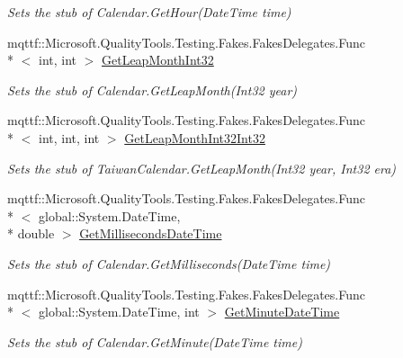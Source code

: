 \begin{DoxyCompactItemize}
\begin{DoxyCompactList}\small\item\em Sets the stub of Calendar.\-Get\-Hour(\-Date\-Time time)\end{DoxyCompactList}\item 
mqttf\-::\-Microsoft.\-Quality\-Tools.\-Testing.\-Fakes.\-Fakes\-Delegates.\-Func\\*
$<$ int, int $>$ \hyperlink{class_system_1_1_globalization_1_1_fakes_1_1_stub_taiwan_calendar_ab73651bdb479c8df951ace386e1e6d74}{Get\-Leap\-Month\-Int32}
\begin{DoxyCompactList}\small\item\em Sets the stub of Calendar.\-Get\-Leap\-Month(\-Int32 year)\end{DoxyCompactList}\item 
mqttf\-::\-Microsoft.\-Quality\-Tools.\-Testing.\-Fakes.\-Fakes\-Delegates.\-Func\\*
$<$ int, int, int $>$ \hyperlink{class_system_1_1_globalization_1_1_fakes_1_1_stub_taiwan_calendar_ae664daa260eff8112159e9779c6f832e}{Get\-Leap\-Month\-Int32\-Int32}
\begin{DoxyCompactList}\small\item\em Sets the stub of Taiwan\-Calendar.\-Get\-Leap\-Month(\-Int32 year, Int32 era)\end{DoxyCompactList}\item 
mqttf\-::\-Microsoft.\-Quality\-Tools.\-Testing.\-Fakes.\-Fakes\-Delegates.\-Func\\*
$<$ global\-::\-System.\-Date\-Time, \\*
double $>$ \hyperlink{class_system_1_1_globalization_1_1_fakes_1_1_stub_taiwan_calendar_ae5c03cd2e2ba3f9dad2fb0d37b4f7e01}{Get\-Milliseconds\-Date\-Time}
\begin{DoxyCompactList}\small\item\em Sets the stub of Calendar.\-Get\-Milliseconds(\-Date\-Time time)\end{DoxyCompactList}\item 
mqttf\-::\-Microsoft.\-Quality\-Tools.\-Testing.\-Fakes.\-Fakes\-Delegates.\-Func\\*
$<$ global\-::\-System.\-Date\-Time, int $>$ \hyperlink{class_system_1_1_globalization_1_1_fakes_1_1_stub_taiwan_calendar_a12c27e19366489da1c7bc0935a018e35}{Get\-Minute\-Date\-Time}
\begin{DoxyCompactList}\small\item\em Sets the stub of Calendar.\-Get\-Minute(\-Date\-Time time)\end{DoxyCompactList}\item 

\end{DoxyCompactItemize}
